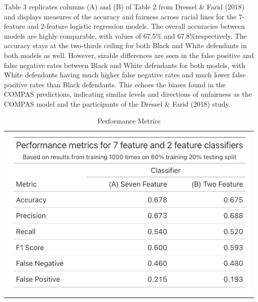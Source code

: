 \documentclass[12pt, ]{article}
\begin{document}
Table 3 replicates columns (A) and (B) of Table 2 from Dressel \& Farid
(2018) and displays measures of the accuracy and fairness across racial
lines for the 7-feature and 2-feature logistic regression models. The
overall accuracies between models are highly comparable, with values of
67.5\% and 67.8\%respectively. The accuracy stays at the two-thirds
ceiling for both Black and White defendants in both models as well.
However, sizable differences are seen in the false positive and false
negative rates between Black and White defendants for both models, with
White defendants having much higher false negative rates and much lower
false positive rates than Black defendants. This echoes the biases found
in the COMPAS predictions, indicating similar levels and directions of
unfairness as the COMPAS model and the participants of the Dressel \&
Farid (2018) study.

\hypertarget{tbl-4}{}
\begin{longtable}[]{@{}l@{}}
\caption{\label{tbl-4}Performance Metrics}\tabularnewline
\toprule\noalign{}
\endfirsthead
\endhead
\bottomrule\noalign{}
\endlastfoot
\includegraphics{tables/tbl4.png} \\
\end{longtable}
\end{document}

